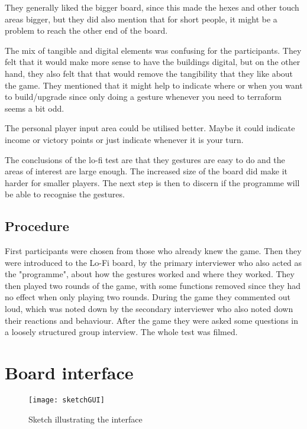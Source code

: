 They generally liked the bigger board, since this made the hexes and other touch areas bigger, but they did also mention that for short people, it might be a problem to reach the other end of the board. 

The mix of tangible and digital elements was confusing for the participants. They felt that it would make more sense to have the buildings digital, but on the other hand, they also felt that that would remove the tangibility that they like about the game. They mentioned that it might help to indicate where or when you want to build/upgrade since only doing a gesture whenever you need to terraform seems a bit odd. 

The personal player input area could be utilised better. Maybe it could indicate income or victory points or just indicate whenever it is your turn. 

The conclusions of the lo-fi test are that they gestures are easy to do and the areas of interest are large enough. The increased size of the board did make it harder for smaller players. The next step is then to discern if the programme will be able to recognise the gestures. 

\subsection{Procedure}
First participants were chosen from those who already knew the game.
Then they were introduced to the Lo-Fi board, by the primary interviewer who also acted as the "programme", about how the gestures worked and where they worked. They then played two rounds of the game, with some functions removed since they had no effect when only playing two rounds. During the game they commented out loud, which was noted down by the secondary interviewer who also noted down their reactions and behaviour. 
After the game they were asked some questions in a loosely structured group interview. 
The whole test was filmed.

\section{Board interface}
\begin{figure}
\centering
\texttt{[image: sketchGUI]}
\caption{Sketch illustrating the interface}
\end{figure}

